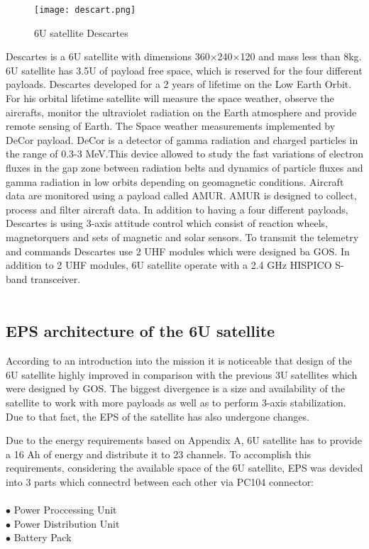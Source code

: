 \begin{figure}[h]
	\centering
	\texttt{[image: descart.png]}
	\caption{6U satellite Descartes}
	\label{fig: EPS}
\end{figure}


  Descartes is a 6U satellite with dimensions 360$\times$240$\times$120 and mass less than 8kg. 6U satellite has 3.5U of payload free space, which is reserved for the four different payloads. Descartes developed for a 2 years of lifetime on the Low Earth Orbit. For his orbital lifetime satellite will measure the space weather, observe the aircrafts, monitor the ultraviolet radiation on the Earth atmosphere  and provide remote sensing of Earth. The Space weather measurements implemented by DeCor payload. DeCor is a detector of gamma radiation and charged particles in the range of 0.3-3 MeV.This device allowed to study the fast variations of electron fluxes in the gap zone between radiation belts and dynamics of particle fluxes and gamma radiation in low orbits depending on geomagnetic conditions. Aircraft data are monitored using a payload called AMUR. AMUR is designed to collect, process and filter aircraft data. 
  In addition to having a four different payloads, Descartes is using 3-axis attitude control which consist of reaction wheels, magnetorquers and sets of magnetic and solar sensors. To transmit the telemetry and commands Descartes use 2 UHF modules which were designed ba GOS. In addition to 2 UHF modules, 6U satellite operate with a 2.4 GHz HISPICO S-band transceiver.\\ \\
 
  \subsection{EPS architecture of the 6U satellite}
  According to an introduction into the mission it is noticeable that design of the 6U satellite highly improved in comparison with the previous 3U satellites which were designed by GOS. The biggest divergence is a size and availability of the satellite to work with more payloads as well as to perform 3-axis stabilization. Due to that fact, the EPS of the satellite has also undergone changes.
  
  Due to the energy requirements based on Appendix A, 6U satellite has to provide a 16 Ah of energy and  distribute it to 23 channels. To accomplish this requirements, considering the available space of the 6U satellite, EPS was devided into 3 parts which connectrd between each other via PC104 connector:\\ \\
  $\bullet$ Power Proccessing Unit\\
  $\bullet$ Power Distribution Unit\\
  $\bullet$ Battery Pack\\
  
